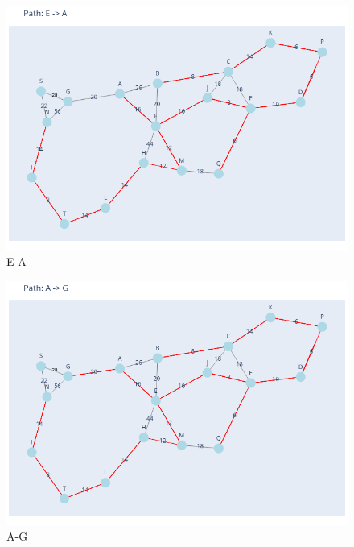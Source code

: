 \documentclass[11pt]{book}
\renewcommand{\=}[1]{\stackrel{#1}{=}} %
\theoremstyle{definition}
\theoremstyle{remark}
\begin{document}
\begin{figure}
    \centering
    \includegraphics[width=1\linewidth]{Trenches/15.png}
    \caption{E-A}
    \label{fig:enter-label}
\end{figure}
\begin{figure}
    \centering
    \includegraphics[width=1\linewidth]{Trenches/16.png}
    \caption{A-G}
    \label{fig:enter-label}
\end{figure}
\end{document}
